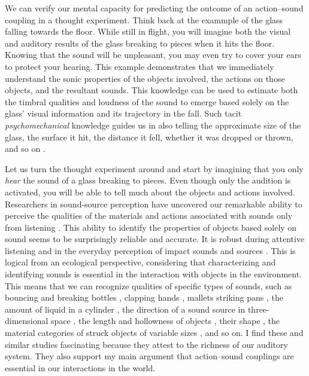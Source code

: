 We can verify our mental capacity for predicting the outcome of an action--sound coupling in a thought experiment. Think back at the exammple of the glass falling towards the floor. While still in flight, you will imagine both the visual and auditory results of the glass breaking to pieces when it hits the floor. Knowing that the sound will be unpleasant, you may even try to cover your ears to protect your hearing. This example demonstrates that we immediately understand the sonic properties of the objects involved, the actions on those objects, and the resultant sounds. This knowledge can be used to estimate both the timbral qualities and loudness of the sound to emerge based solely on the glass' visual information and its trajectory in the fall. Such tacit \emph{psychomechanical} knowledge guides us in also telling the approximate size of the glass, the surface it hit, the distance it fell, whether it was dropped or thrown, and so on \citep{mcadams_psychomechanics_2000}.

Let us turn the thought experiment around and start by imagining that you only \emph{hear} the sound of a glass breaking to pieces. Even though only the audition is activated, you will be able to tell much about the objects and actions involved. Researchers in sound-source perception have uncovered our remarkable ability to perceive the qualities of the materials and actions associated with sounds only from listening \citep{gaver_how_1993,gaver_what_1993}.
This ability to identify the properties of objects based solely on sound seems to be surprisingly reliable and accurate. It is robust during attentive listening and in the everyday perception of impact sounds and sources \citep{rocchesso_sounding_2003}. This is logical from an ecological perspective, considering that characterizing and identifying sounds is essential in the interaction with objects in the environment.
This means that we can recognize qualities of specific types of sounds, such as bouncing and breaking bottles \citep{warren_auditory_1984}, clapping hands \citep{repp_sound_1987}, mallets striking pans \citep{freed_auditory_1990}, the amount of liquid in a cylinder \citep{cabe_human_2000}, the direction of a sound source in three-dimensional space \citep{neuhoff_perceiving_2001}, the length and hollowness of objects \citep{carello_perception_1998,lutfi_auditory_2001},
their shape \citep{kunkler-peck_hearing_2000}, the material categories of struck objects of variable sizes \citep{giordano_material_2006}, and so on. I find these and similar studies fascinating because they attest to the richness of our auditory system. They also support my main argument that action--sound couplings are essential in our interactions in the world.


